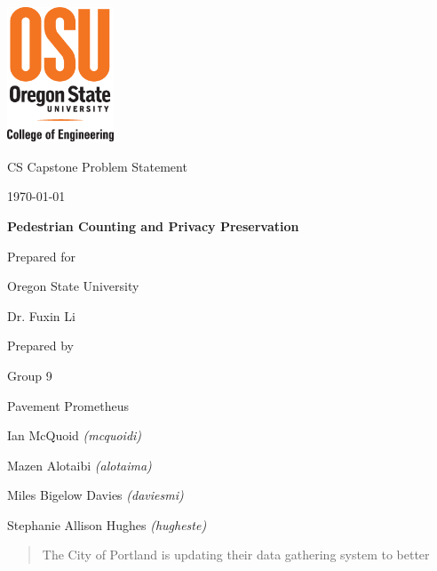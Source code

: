 \documentclass[onecolumn, draftclsnofoot,10pt, compsoc]{IEEEtran}
\def \CapstoneTeamName{		Pavement Prometheus}
\def \CapstoneTeamNumber{		9}
\def \GroupMemberOne{			Ian McQuoid  \textit{(mcquoidi)}}
\def \GroupMemberTwo{			Mazen Alotaibi \textit{(alotaima)}}
\def \GroupMemberThree{			Miles Bigelow Davies  \textit{(daviesmi)}}
\def \GroupMemberFour{			Stephanie Allison Hughes \textit{(hugheste)}}
\def \CapstoneProjectName{		Pedestrian Counting and Privacy Preservation}
\def \CapstoneSponsorCompany{	Oregon State University}
\def \CapstoneSponsorPerson{		Dr. Fuxin Li}
\def \DocType{		Problem Statement
				}
\newcommand{\NameSigPair}[1]{\par
\makebox[2.75in][r]{#1} \hfil 	\makebox[3.25in]{\makebox[2.25in]{\hrulefill} \hfill		\makebox[.75in]{\hrulefill}}
\par\vspace{-12pt} \textit{\tiny\noindent
\makebox[2.75in]{} \hfil		\makebox[3.25in]{\makebox[2.25in][r]{Signature} \hfill	\makebox[.75in][r]{Date}}}}
\renewcommand{\NameSigPair}[1]{#1}
\begin{document}
\begin{titlepage}
    \begin{singlespace}
    	\includegraphics[height=4cm]{images/coe_v_spot1}
        \hfill 
        \par\vspace{.2in}
        \centering
        \scshape{
            \huge CS Capstone \DocType \par
            {\large\today}\par
            \vspace{.5in}
            \textbf{\Huge\CapstoneProjectName}\par
            {\large Prepared for}\par
            \Huge \CapstoneSponsorCompany\par
            \vspace{5pt}
            {\Large\NameSigPair{\CapstoneSponsorPerson}\par}
            {\large Prepared by }\par
            Group\CapstoneTeamNumber\par
            \CapstoneTeamName\par 
            \vspace{5pt}
            {\Large
                \NameSigPair{\GroupMemberOne}\par
                \NameSigPair{\GroupMemberTwo}\par
                \NameSigPair{\GroupMemberThree}\par
                \NameSigPair{\GroupMemberFour}\par
            }
            \vspace{20pt}
        }
        \begin{abstract}
        The City of Portland is updating their data gathering system to better 

\end{abstract}
\end{singlespace}
\end{titlepage}
\end{document}
